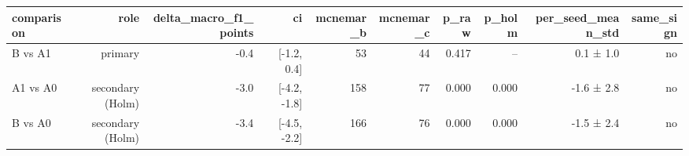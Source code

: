 \begin{tabular}{lrrrrrrrrr}
\toprule
comparison & role & delta\_macro\_f1\_points & ci & mcnemar\_b & mcnemar\_c & p\_raw & p\_holm & per\_seed\_mean\_std & same\_sign \\
\midrule
B vs A1 & primary & -0.4 & [-1.2, 0.4] & 53 & 44 & 0.417 & -- & 0.1 ± 1.0 & no \\
A1 vs A0 & secondary (Holm) & -3.0 & [-4.2, -1.8] & 158 & 77 & 0.000 & 0.000 & -1.6 ± 2.8 & no \\
B vs A0 & secondary (Holm) & -3.4 & [-4.5, -2.2] & 166 & 76 & 0.000 & 0.000 & -1.5 ± 2.4 & no \\
\bottomrule
\end{tabular}
